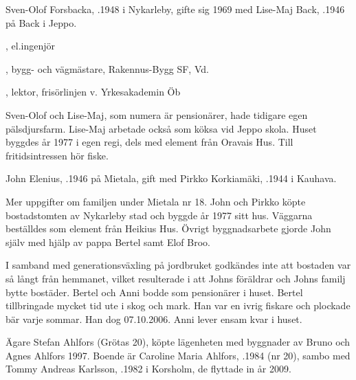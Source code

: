 
Sven-Olof Forsbacka, .1948 i Nykarleby, gifte sig 1969 med Lise-Maj Back, .1946 på Back i Jeppo.
\begin{jhchildren}
  \item {}, el.ingenjör
  \item {}, bygg- och vägmästare, Rakennus-Bygg SF, Vd.
  \item {}, lektor, frisörlinjen v. Yrkesakademin Öb
\end{jhchildren}
Sven-Olof och Lise-Maj, som numera är pensionärer, hade tidigare egen pälsdjursfarm. Lise-Maj arbetade också som köksa vid Jeppo skola. Huset byggdes år 1977 i egen regi, dels med element från Oravais Hus. Till fritidsintressen hör fiske.




John Elenius, .1946 på Mietala, gift med Pirkko Korkiamäki, .1944 i Kauhava.
\begin{jhchildren}
  \item {}
  \item {}
\end{jhchildren}

Mer uppgifter om familjen under Mietala nr 18. John och Pirkko köpte bostadstomten av Nykarleby stad och byggde år 1977 sitt hus. Väggarna beställdes som element från Heikius Hus. Övrigt byggnadsarbete gjorde John själv med hjälp av pappa Bertel samt Elof Broo.

I samband med generationsväxling på jordbruket godkändes inte att bostaden var så långt från hemmanet, vilket resulterade i att Johns föräldrar och Johns familj bytte bostäder. Bertel och Anni bodde som pensionärer i huset. Bertel tillbringade mycket tid ute i skog och mark. Han var en ivrig fiskare och plockade bär varje sommar. Han dog 07.10.2006. Anni lever ensam kvar i huset.




Ägare Stefan Ahlfors (Grötas 20), köpte lägenheten med byggnader av Bruno och Agnes Ahlfors 1997. Boende är Caroline  Maria Ahlfors, .1984 (nr 20), sambo med Tommy Andreas Karlsson, .1982 i Korsholm, de flyttade in år 2009.

